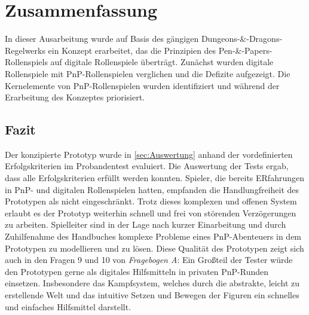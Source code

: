 \chapter{Zusammenfassung}
\label{conclusion}
In dieser Ausarbeitung wurde auf Basis des gängigen Dungeons-\&-Dragons-Regel\-werks ein Konzept erarbeitet, das die Prinzipien des Pen-\&-Papers-Rollenspiels auf digitale Rollenspiele überträgt. Zunächst wurden digitale Rollenspiele mit PnP-Rollenspielen verglichen und die Defizite aufgezeigt. Die Kernelemente von PnP-Rollenspielen wurden identifiziert und während der Erarbeitung des Konzeptes priorisiert.\\

\section{Fazit}
Der konzipierte Prototyp wurde in \ref{sec:Auswertung} anhand der vordefinierten Erfolgskriterien im Probandentest evaluiert. Die Auswertung der Tests ergab, dass alle Erfolgskriterien erfüllt werden konnten. Spieler, die bereits ERfahrungen in PnP- und digitalen Rollenspielen hatten, empfanden die Handlungfreiheit des Prototypen als nicht eingeschränkt. Trotz dieses komplexen und offenen System erlaubt es der Prototyp weiterhin schnell und frei von störenden Verzögerungen zu arbeiten. Spielleiter sind in der Lage nach kurzer Einarbeitung und durch Zuhilfenahme des Handbuches komplexe Probleme eines PnP-Abenteuers in dem Prototypen zu modellieren und zu lösen. Diese Qualität des Prototypen zeigt sich auch in den Fragen 9 und 10 von \emph{Fragebogen A}: Ein Großteil der Tester würde den Prototypen gerne als digitales Hilfsmitteln in privaten PnP-Runden einsetzen. Insbesondere das Kampfsystem, welches durch die abstrakte, leicht zu erstellende Welt und das intuitive Setzen und Bewegen der Figuren ein schnelles und einfaches Hilfsmittel darstellt.



